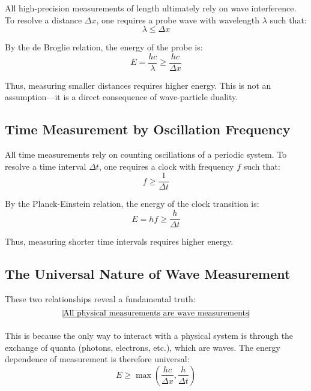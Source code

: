 \documentclass[aps,preprint,showpacs,showkeys]{revtex4}
\begin{document}
All high-precision measurements of length ultimately rely on wave
interference. To resolve a distance $\Delta x$, one requires a probe wave
with wavelength $\lambda$ such that: 
\begin{equation}
\lambda \le \Delta x
\end{equation}

By the de Broglie relation, the energy of the probe is: 
\begin{equation}
E = \frac{hc}{\lambda} \ge \frac{hc}{\Delta x}
\end{equation}

Thus, measuring smaller distances requires higher energy. This is not an
assumption---it is a direct consequence of wave-particle duality.

\subsection{Time Measurement by Oscillation Frequency}

All time measurements rely on counting oscillations of a periodic system. To
resolve a time interval $\Delta t$, one requires a clock with frequency $f$
such that: 
\begin{equation}
f \ge \frac{1}{\Delta t}
\end{equation}

By the Planck-Einstein relation, the energy of the clock transition is: 
\begin{equation}
E = hf \ge \frac{h}{\Delta t}
\end{equation}

Thus, measuring shorter time intervals requires higher energy.

\subsection{The Universal Nature of Wave Measurement}

These two relationships reveal a fundamental truth: 
\begin{equation}
\frame{All physical measurements are wave measurements}
\end{equation}

This is because the only way to interact with a physical system is through
the exchange of quanta (photons, electrons, etc.), which are waves. The
energy dependence of measurement is therefore universal: 
\begin{equation}
E \ge \max\left(\frac{hc}{\Delta x}, \frac{h}{\Delta t}\right)
\end{equation}
\end{document}
